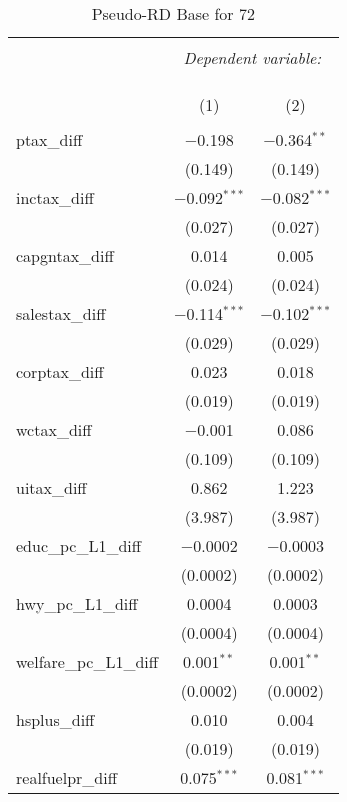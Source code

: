 
\begin{table}[!htbp] \centering 
  \caption{Pseudo-RD Base for  72} 
  \label{} 
\begin{tabular}{@{\extracolsep{5pt}}lcc} 
\\[-1.8ex]\hline 
\hline \\[-1.8ex] 
 & \multicolumn{2}{c}{\textit{Dependent variable:}} \\ 
\cline{2-3} 
\\[-1.8ex] & \multicolumn{2}{c}{ } \\ 
\\[-1.8ex] & (1) & (2)\\ 
\hline \\[-1.8ex] 
 ptax\_diff & $-$0.198 & $-$0.364$^{**}$ \\ 
  & (0.149) & (0.149) \\ 
  inctax\_diff & $-$0.092$^{***}$ & $-$0.082$^{***}$ \\ 
  & (0.027) & (0.027) \\ 
  capgntax\_diff & 0.014 & 0.005 \\ 
  & (0.024) & (0.024) \\ 
  salestax\_diff & $-$0.114$^{***}$ & $-$0.102$^{***}$ \\ 
  & (0.029) & (0.029) \\ 
  corptax\_diff & 0.023 & 0.018 \\ 
  & (0.019) & (0.019) \\ 
  wctax\_diff & $-$0.001 & 0.086 \\ 
  & (0.109) & (0.109) \\ 
  uitax\_diff & 0.862 & 1.223 \\ 
  & (3.987) & (3.987) \\ 
  educ\_pc\_L1\_diff & $-$0.0002 & $-$0.0003 \\ 
  & (0.0002) & (0.0002) \\ 
  hwy\_pc\_L1\_diff & 0.0004 & 0.0003 \\ 
  & (0.0004) & (0.0004) \\ 
  welfare\_pc\_L1\_diff & 0.001$^{**}$ & 0.001$^{**}$ \\ 
  & (0.0002) & (0.0002) \\ 
  hsplus\_diff & 0.010 & 0.004 \\ 
  & (0.019) & (0.019) \\ 
  realfuelpr\_diff & 0.075$^{***}$ & 0.081$^{***}$ \\ 

\end{tabular}
\end{table}
